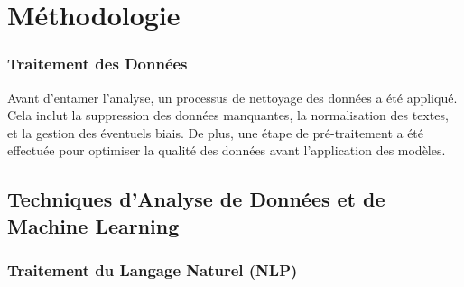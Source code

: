 


\section{Méthodologie}










\newpage




























\subsubsection{Traitement des Données}

Avant d'entamer l'analyse, un processus de nettoyage des données a été appliqué. Cela inclut la suppression des données manquantes, la normalisation des textes, et la gestion des éventuels biais. De plus, une étape de pré-traitement a été effectuée pour optimiser la qualité des données avant l'application des modèles.

\subsection{Techniques d'Analyse de Données et de Machine Learning}

\subsubsection{Traitement du Langage Naturel (NLP)}

